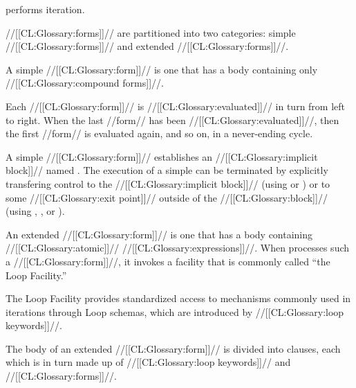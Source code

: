 


 performs iteration.


 //[[CL:Glossary:forms]]// are partitioned into two categories: 
     simple  //[[CL:Glossary:forms]]// 
 and extended  //[[CL:Glossary:forms]]//.

 

A simple  //[[CL:Glossary:form]]// is one that has a body containing only //[[CL:Glossary:compound forms]]//.

Each //[[CL:Glossary:form]]// is //[[CL:Glossary:evaluated]]// in turn from left to right. When the last //form// has been //[[CL:Glossary:evaluated]]//,  then the first //form// is evaluated again, and so on, in a never-ending cycle.

A simple  //[[CL:Glossary:form]]// establishes an //[[CL:Glossary:implicit block]]// named \nil. The execution of a simple  can be terminated by explicitly transfering control to the //[[CL:Glossary:implicit block]]// (using  or ) or to some //[[CL:Glossary:exit point]]// outside of the //[[CL:Glossary:block]]//  (\eg using , , or ).

\endsubsubsubsection%


An extended  //[[CL:Glossary:form]]// is one that has a body containing //[[CL:Glossary:atomic]]// //[[CL:Glossary:expressions]]//.  When  processes such a //[[CL:Glossary:form]]//, it invokes a facility that is commonly called ``the Loop Facility.''

The Loop Facility provides standardized access to mechanisms commonly used  in iterations through Loop schemas, which are introduced by //[[CL:Glossary:loop keywords]]//.

The body of an extended  //[[CL:Glossary:form]]// is divided into  clauses, each which is in turn made up of //[[CL:Glossary:loop keywords]]// and //[[CL:Glossary:forms]]//. 

\endsubsubsubsection%

\endsubsubsection%

